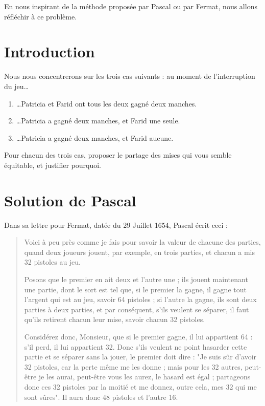 \documentclass{article}
\begin{document}
En nous inspirant de la méthode proposée par Pascal ou par Fermat, nous allons réfléchir à ce problème.

\section{Introduction}
Nous nous concentrerons sur les trois cas suivants : au moment de l'interruption du jeu\dots
\begin{enumerate}
\item \dots Patricia et Farid ont tous les deux gagné deux manches.\label{22}
\item \dots Patricia a gagné deux manches, et Farid une seule.\label{21}
\item \dots Patricia a gagné deux manches, et Farid aucune.\label{20}
\end{enumerate}
\begin{tcolorbox}
Pour chacun des trois cas, proposer le partage des mises qui vous semble équitable, et justifier pourquoi.
\end{tcolorbox}

\section{Solution de Pascal}

Dans sa lettre pour Fermat, datée du 29 Juillet 1654, Pascal écrit ceci :

\begin{quote}
\og Voici à peu près comme je fais pour savoir la valeur de chacune des parties, quand deux joueurs jouent, par exemple, en trois parties, et chacun a mis 32 pistoles au jeu.

Posons que le premier en ait deux et l'autre une ; ils jouent maintenant une partie, dont le sort est tel que, si le premier la gagne, il gagne tout l'argent qui est au jeu, savoir 64 pistoles ; si l'autre la gagne, ils sont deux parties à deux parties, et par conséquent, s'ils veulent se séparer, il faut qu'ils retirent chacun
leur mise, savoir chacun 32 pistoles.

Considérez donc, Monsieur, que si le premier gagne, il lui appartient 64 : s'il perd, il lui appartient 32. Donc s'ils veulent ne point hasarder cette partie et se séparer sans la jouer, le premier doit dire : "Je suis sûr d'avoir 32 pistoles, car la perte même me les donne ; mais pour les 32 autres, peut-être je les aurai, peut-être vous les aurez, le hasard est égal ; partageons donc ces 32 pistoles par la moitié et me donnez, outre cela, mes 32 qui me sont sûres". Il aura donc 48 pistoles et l'autre 16.\fg
\end{quote}
\end{document}
